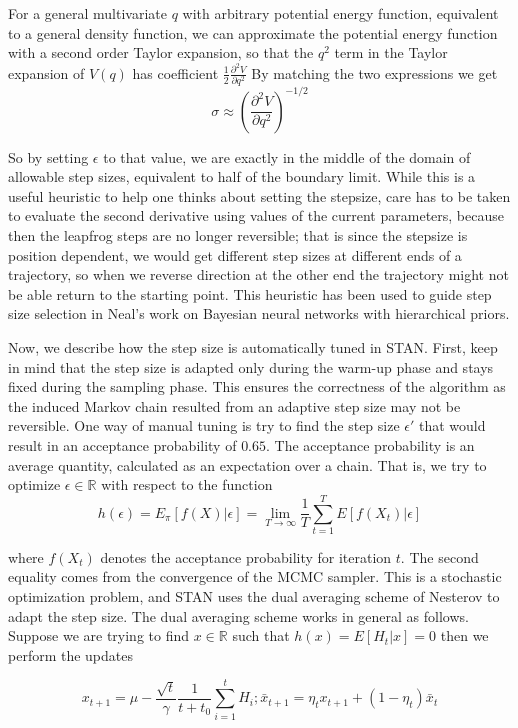 \documentclass[12pt]{report}
\begin{document}
For a general multivariate $q$ with arbitrary potential energy function, equivalent to a general density function, we can approximate the potential energy function with a second order Taylor expansion, so that the $q^2$ term in the Taylor expansion of $V(q)$ has coefficient $\frac{1}{2} \frac{\partial^2 V}{\partial q^2}$  
By matching the two expressions we get 
\[ \sigma \approx ( \frac{\partial^2 V}{\partial q^2})^{-1/2} \]

So by setting $\epsilon$ to that value, we are exactly in the middle of the domain of allowable step sizes, equivalent to half of the boundary limit. While this is a useful heuristic to help one thinks about setting the stepsize,
care has to be taken to evaluate the second derivative using values of the current parameters, because then the leapfrog steps are no longer reversible; that is since the stepsize is position dependent, we would get different step sizes at different ends of a trajectory, so when we reverse direction at the other end the trajectory might not be able return to the starting point. This heuristic has been used to guide step size selection in Neal's work on Bayesian neural networks with hierarchical priors.


Now, we describe how the step size is automatically tuned in STAN. First, keep
in mind that the step size is adapted only during the warm-up phase and stays
fixed during the sampling phase. This ensures the correctness of the algorithm
as the induced Markov chain resulted from an adaptive step size may not be
reversible. One way of manual tuning is try to find the step size
$\epsilon'$ that would result in an acceptance probability of $0.65$. The
acceptance probability is an average quantity, calculated as an expectation
over a chain. That is, we try to optimize $\epsilon \in \mathbb{R}$ with respect
to the function 
\[ h(\epsilon) = E_\pi[f(X)|\epsilon]  = \lim_{T \rightarrow \infty} \frac{1}{T}
\sum_{t=1}^T E[f(X_t)|\epsilon] \]

where $f(X_t)$ denotes the acceptance probability for iteration $t$. The
second equality comes from the convergence of the MCMC sampler. This is a
stochastic optimization problem, and STAN uses the dual averaging scheme of
Nesterov  to adapt the step size. The dual averaging scheme works in general as
follows. Suppose we are trying to find $x\in \mathbb{R}$ such that $h(x) =
E[H_t|x] = 0$ then we perform the updates 

\[x_{t+1}  = \mu - \frac{\sqrt{t}}{\gamma} \frac{1}{t+t_0} \sum_{i=1}^tH_i;
\bar{x}_{t+1} = \eta_t x_{t+1} + (1-\eta_t) \bar{x}_t \]
\end{document}
